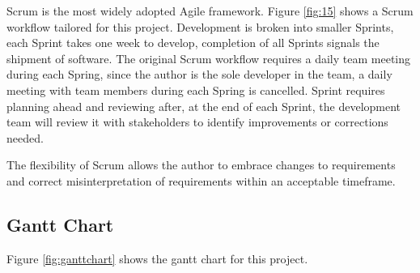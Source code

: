 \documentclass[11pt,a4paper]{article}
\begin{document}
Scrum is the most widely adopted Agile framework. Figure \ref{fig:15} shows a Scrum workflow tailored for this project. Development is broken into smaller Sprints, each Sprint takes one week to develop, completion of all Sprints signals the shipment of software. The original Scrum workflow requires a daily team meeting during each Spring, since the author is the sole developer in the team, a daily meeting with team members during each Spring is cancelled. Sprint requires planning ahead and reviewing after, at the end of each Sprint, the development team will review it with stakeholders to identify improvements or corrections needed.

The flexibility of Scrum allows the author to embrace changes to requirements and correct misinterpretation of requirements within an acceptable timeframe.

\subsection{Gantt Chart}
Figure \ref{fig:ganttchart} shows the gantt chart for this project. 
\end{document}
